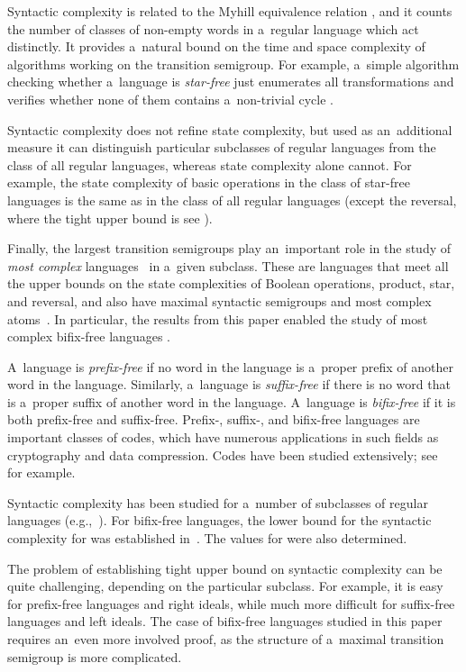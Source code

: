 \documentclass{amsart}
\begin{document}
Syntactic complexity is related to the Myhill equivalence relation \cite{Myh57}, and it counts the number of classes of non-empty words in a~regular language which act distinctly.
It provides a~natural bound on the time and space complexity of algorithms working on the transition semigroup.
For example, a~simple algorithm checking whether a~language is \emph{star-free} just enumerates all transformations and verifies whether none of them contains a~non-trivial cycle \cite{McSe71}.

Syntactic complexity does not refine state complexity, but used as an~additional measure it can distinguish particular subclasses of regular languages from
the class of all regular languages, whereas state complexity alone cannot.
For example, the state complexity of basic operations in the class of star-free languages is the same as in the class of all regular languages (except the reversal, where the tight upper bound is  see \cite{BrSz15Aperiodic}).

Finally, the largest transition semigroups play an~important role in the study of \emph{most complex} languages~\cite{Brz13} in a~given subclass.
These are languages that meet all the upper bounds on the state complexities of Boolean operations, product, star, and reversal, and also have maximal syntactic semigroups and most complex atoms~\cite{BrTa14}.
In particular, the results from this paper enabled the study of most complex bifix-free languages \cite{FeSz17ComplexityOfBifixFree}.

A~language is \emph{prefix-free} if no word in the language is a~proper prefix of another word in the language.
Similarly, a~language is \emph{suffix-free} if there is no word that is a~proper suffix of another word in the language.
A~language is \emph{bifix-free} if it is both prefix-free and suffix-free.
Prefix-, suffix-, and bifix-free languages are important classes of codes, which have numerous applications in such fields as cryptography and data compression.
Codes have been studied extensively; see~\cite{BPR09} for example.

Syntactic complexity has been studied for a~number of subclasses of regular languages (e.g.,~\cite{BrLi15,BLL12,BLY12,BrSz15Aperiodic,HoKo04,IvNa14}).
For bifix-free languages, the lower bound  for the syntactic complexity for  was established in~\cite{BLY12}. The values for  were also determined.

The problem of establishing tight upper bound on syntactic complexity can be quite challenging, depending on the particular subclass.
For example, it is easy for prefix-free languages and right ideals, while much more difficult for suffix-free languages and left ideals.
The case of bifix-free languages studied in this paper requires an~even more involved proof, as the structure of a~maximal transition semigroup is more complicated.
\end{document}

